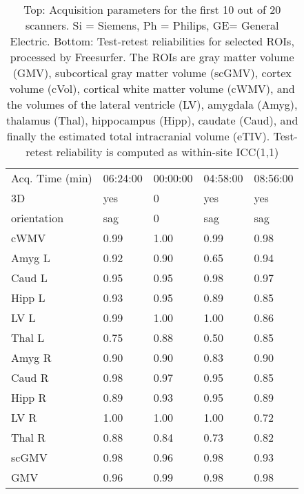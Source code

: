\begin{table}
\begin{tabular}{lllll}
Acq. Time (min)       &           06:24:00 &           00:00:00 &             04:58:00 &             08:56:00 \\
3D                    &                yes &                  0 &                  yes &                  yes \\
orientation           &                sag &                  0 &                  sag &                  sag \\
cWMV                  &               0.99 &               1.00 &                 0.99 &                 0.98 \\
Amyg L                &               0.92 &               0.90 &                 0.65 &                 0.94 \\
Caud L                &               0.95 &               0.95 &                 0.98 &                 0.97 \\
Hipp L                &               0.93 &               0.95 &                 0.89 &                 0.85 \\
LV L                  &               0.99 &               1.00 &                 1.00 &                 0.86 \\
Thal L                &               0.75 &               0.88 &                 0.50 &                 0.85 \\
Amyg R                &               0.90 &               0.90 &                 0.83 &                 0.90 \\
Caud R                &               0.98 &               0.97 &                 0.95 &                 0.85 \\
Hipp R                &               0.89 &               0.93 &                 0.95 &                 0.89 \\
LV R                  &               1.00 &               1.00 &                 1.00 &                 0.72 \\
Thal R                &               0.88 &               0.84 &                 0.73 &                 0.82 \\
scGMV                 &               0.98 &               0.96 &                 0.98 &                 0.93 \\
GMV                   &               0.96 &               0.99 &                 0.98 &                 0.98 \\
\bottomrule
\end{tabular}
\caption{Top: Acquisition parameters for the first 10 out of 20 scanners. Si = Siemens, Ph = Philips, GE= General Electric. Bottom: Test-retest reliabilities for selected ROIs, processed by Freesurfer. The ROIs are gray matter volume (GMV), subcortical gray matter volume (scGMV), cortex volume (cVol), cortical white matter volume (cWMV), and the volumes of the lateral ventricle (LV), amygdala (Amyg), thalamus (Thal), hippocampus (Hipp), caudate (Caud), and finally the estimated total intracranial volume (eTIV). Test-retest reliability is computed as within-site ICC(1,1)} 
\label{tab:acquisition1}

\end{table}